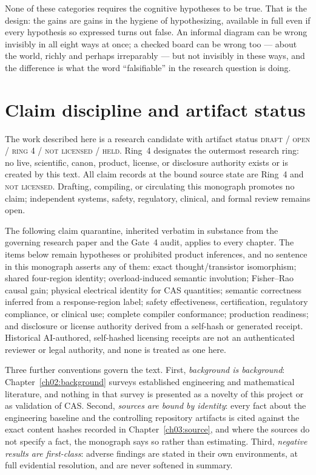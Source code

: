None of these categories requires the cognitive hypotheses to be true.
That is the design: the gains are gains in the hygiene of hypothesizing,
available in full even if every hypothesis so expressed turns out false.
An informal diagram can be wrong invisibly in all eight ways at once; a
checked board can be wrong too --- about the world, richly and perhaps
irreparably --- but not invisibly in these ways, and the difference is
what the word ``falsifiable'' in the research question is doing.

\section{Claim discipline and artifact status}\label{ch01:discipline}

\begin{boundary}\label{ch01:bnd:standing}
The work described here is a research candidate with artifact status
\textsc{draft / open / ring 4 / not licensed / held}. Ring~4 designates the
outermost research ring: no live, scientific, canon, product, license, or
disclosure authority exists or is created by this text. All claim records at
the bound source state are Ring~4 and \textsc{not licensed}. Drafting,
compiling, or circulating this monograph promotes no claim; independent
systems, safety, regulatory, clinical, and formal review remains open.
\end{boundary}

The following claim quarantine, inherited verbatim in substance from the
governing research paper and the Gate~4 audit, applies to every chapter. The
items below remain hypotheses or prohibited product inferences, and no
sentence in this monograph asserts any of them: exact thought/transistor
isomorphism; shared four-region identity; overload-induced semantic
involution; Fisher--Rao causal gain; physical electrical identity for CAS
quantities; semantic correctness inferred from a response-region label;
safety effectiveness, certification, regulatory compliance, or clinical use;
complete compiler conformance; production readiness; and disclosure or
license authority derived from a self-hash or generated receipt. Historical
AI-authored, self-hashed licensing receipts are not an authenticated
reviewer or legal authority, and none is treated as one here.

Three further conventions govern the text. First, \emph{background is
background}: Chapter~\ref{ch02:background} surveys established engineering
and mathematical literature, and nothing in that survey is presented as a
novelty of this project or as validation of CAS. Second, \emph{sources are
bound by identity}: every fact about the engineering baseline and the
controlling repository artifacts is cited against the exact content hashes
recorded in Chapter~\ref{ch03:source}, and where the sources do not specify
a fact, the monograph says so rather than estimating. Third, \emph{negative
results are first-class}: adverse findings are stated in their own
environments, at full evidential resolution, and are never softened in
summary.

